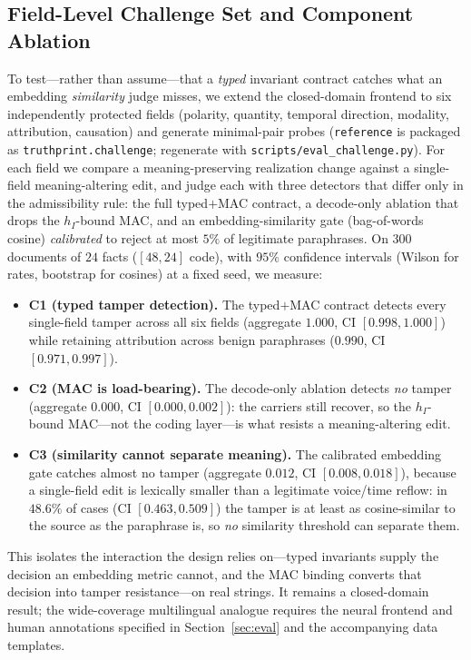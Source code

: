 \documentclass[11pt]{article}
\begin{document}
\subsection{Field-Level Challenge Set and Component Ablation}
\label{sec:challenge}
To test---rather than assume---that a \emph{typed} invariant contract catches
what an embedding \emph{similarity} judge misses, we extend the closed-domain
frontend to six independently protected fields (polarity, quantity, temporal
direction, modality, attribution, causation) and generate minimal-pair probes
(\texttt{reference} is packaged as \texttt{truthprint.challenge}; regenerate
with \texttt{scripts/eval\_challenge.py}). For each field we compare a
meaning-preserving realization change against a single-field meaning-altering
edit, and judge each with three detectors that differ only in the admissibility
rule: the full typed$+$MAC contract, a decode-only ablation that drops the
$h_I$-bound MAC, and an embedding-similarity gate (bag-of-words cosine)
\emph{calibrated} to reject at most $5\%$ of legitimate paraphrases. On $300$
documents of $24$ facts ($[48,24]$ code), with $95\%$ confidence intervals
(Wilson for rates, bootstrap for cosines) at a fixed seed, we measure:
\begin{itemize}[leftmargin=*]
  \item \textbf{C1 (typed tamper detection).} The typed$+$MAC contract detects
  every single-field tamper across all six fields (aggregate
  $1.000$, CI $[0.998,1.000]$) while retaining attribution across benign
  paraphrases ($0.990$, CI $[0.971,0.997]$).
  \item \textbf{C2 (MAC is load-bearing).} The decode-only ablation detects
  \emph{no} tamper (aggregate $0.000$, CI $[0.000,0.002]$): the carriers still
  recover, so the $h_I$-bound MAC---not the coding layer---is what resists a
  meaning-altering edit.
  \item \textbf{C3 (similarity cannot separate meaning).} The calibrated
  embedding gate catches almost no tamper (aggregate $0.012$, CI
  $[0.008,0.018]$), because a single-field edit is lexically smaller than a
  legitimate voice/time reflow: in $48.6\%$ of cases (CI $[0.463,0.509]$) the
  tamper is at least as cosine-similar to the source as the paraphrase is, so
  \emph{no} similarity threshold can separate them.
\end{itemize}
This isolates the interaction the design relies on---typed invariants supply the
decision an embedding metric cannot, and the MAC binding converts that decision
into tamper resistance---on real strings. It remains a closed-domain result;
the wide-coverage multilingual analogue requires the neural frontend and human
annotations specified in Section~\ref{sec:eval} and the accompanying data
templates.
\end{document}
